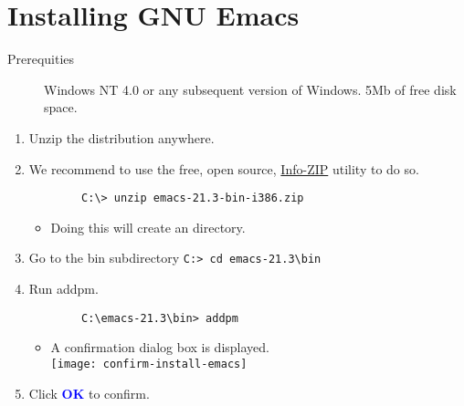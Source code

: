 \documentclass{article}
\newcommand{\uicontrol}[1]{\textcolor{blue}{\textbf{#1}}}
\begin{document}
\section*{Installing GNU Emacs}
\begin{description}
	\item[Prerequities] Windows NT 4.0 or any subsequent version of Windows. 5Mb of free disk space.
\end{description}
\begin{enumerate}
	\item Unzip the distribution anywhere.
	\item We recommend to use the free, open source, \href{http://www.info-zip.org/}{Info-ZIP}
	utility to do so.
	\begin{verbatim}
		C:\> unzip emacs-21.3-bin-i386.zip
	\end{verbatim}
	\begin{itemize}
		\item Doing this will create an  directory.
	\end{itemize}
	\item Go to the bin subdirectory \verb|C:> cd emacs-21.3\bin|
	\item Run addpm.
	\begin{verbatim}
		C:\emacs-21.3\bin> addpm
	\end{verbatim}
	\begin{itemize}
		\item A confirmation dialog box is displayed.\\
		\texttt{[image: confirm-install-emacs]}
	\end{itemize}
	\item Click \uicontrol{OK} to confirm.
\end{enumerate}
\end{document}
